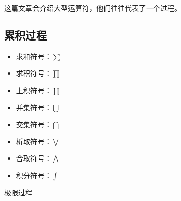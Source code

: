 
\begin{issues}
\issueDraft
\end{issues}

这篇文章会介绍大型运算符，他们往往代表了一个过程。

\subsection{累积过程}
\begin{itemize}
\item 求和符号：$\sum$
\item 求积符号：$\prod$
\item 上积符号：$\coprod$
\item 并集符号：$\bigcup$
\item 交集符号：$\bigcap$
\item 析取符号：$\bigvee$
\item 合取符号：$\bigwedge$
\item 积分符号：$\int$
\end{itemize}

极限过程
